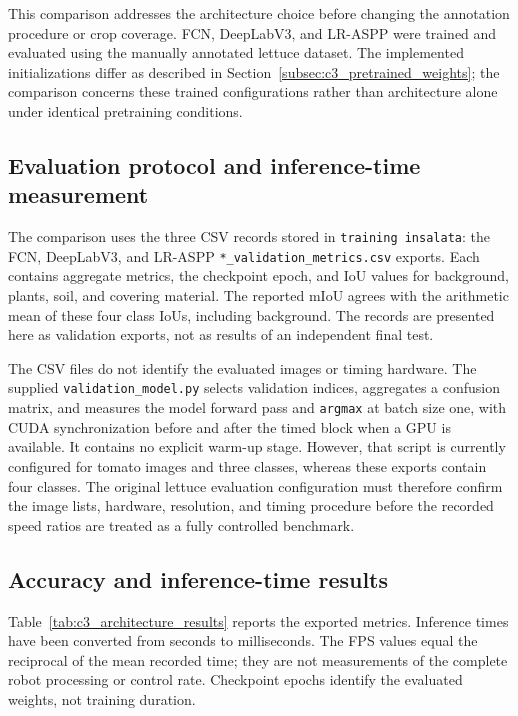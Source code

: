 This comparison addresses the architecture choice before changing the
annotation procedure or crop coverage. FCN, DeepLabV3, and LR-ASPP were
trained and evaluated using the manually annotated lettuce dataset.
The implemented initializations differ as described in
Section~\ref{subsec:c3_pretrained_weights}; the comparison concerns these
trained configurations rather than architecture alone under identical
pretraining conditions.

\subsection{Evaluation protocol and inference-time measurement}
\label{subsec:c3_architecture_protocol}

The comparison uses the three CSV records stored in
\texttt{training insalata}: the FCN, DeepLabV3, and LR-ASPP
\texttt{*\_\allowbreak validation\_\allowbreak metrics.csv} exports.
Each contains aggregate metrics, the checkpoint epoch, and IoU values
for background, plants, soil, and covering material. The reported mIoU
agrees with the arithmetic mean of these four class IoUs, including
background. The records are presented here as validation exports,
not as results of an independent final test.

The CSV files do not identify the evaluated images or timing hardware.
The supplied \texttt{validation\_model.py} selects validation indices,
aggregates a confusion matrix, and measures the model forward pass and
\texttt{argmax} at batch size one, with CUDA synchronization before and
after the timed block when a GPU is available. It contains no explicit
warm-up stage. However, that script is currently configured for tomato
images and three classes, whereas these exports contain four classes.
The original lettuce evaluation configuration must therefore confirm the
image lists, hardware, resolution, and timing procedure before the
recorded speed ratios are treated as a fully controlled benchmark.

\subsection{Accuracy and inference-time results}
\label{subsec:c3_architecture_results}

Table~\ref{tab:c3_architecture_results} reports the exported metrics.
Inference times have been converted from seconds to milliseconds.
The FPS values equal the reciprocal of the mean recorded time; they
are not measurements of the complete robot processing or control rate.
Checkpoint epochs identify the evaluated weights, not training duration.


